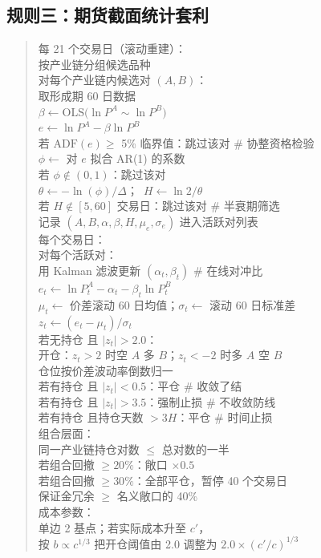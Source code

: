 \subsection{规则三：期货截面统计套利}

\begin{quote}\ttfamily\small
每 21 个交易日（滚动重建）：\\[2pt]
\quad 按产业链分组候选品种\\[2pt]
\quad 对每个产业链内候选对 $(A,B)$：\\
\qquad 取形成期 60 日数据\\
\qquad $\beta \gets \mathrm{OLS}\big(\ln P^A \sim \ln P^B\big)$\\
\qquad $e \gets \ln P^A-\beta\ln P^B$\\
\qquad 若 $\mathrm{ADF}(e)\ge$ 5\% 临界值：跳过该对 \hfill \# 协整资格检验\\
\qquad $\phi \gets$ 对 $e$ 拟合 AR(1) 的系数\\
\qquad 若 $\phi\notin(0,1)$：跳过该对\\
\qquad $\theta \gets -\ln(\phi)/\Delta$；\ $H \gets \ln 2/\theta$\\
\qquad 若 $H\notin[5,60]$ 交易日：跳过该对 \hfill \# 半衰期筛选\\
\qquad 记录 $(A,B,\alpha,\beta,H,\mu_e,\sigma_e)$ 进入活跃对列表\\[2pt]
每个交易日：\\[2pt]
\quad 对每个活跃对：\\
\qquad 用 Kalman 滤波更新 $(\alpha_t,\beta_t)$ \hfill \# 在线对冲比\\
\qquad $e_t \gets \ln P^A_t-\alpha_t-\beta_t\ln P^B_t$\\
\qquad $\mu_t \gets$ 价差滚动 60 日均值；$\sigma_t \gets$ 滚动 60 日标准差\\
\qquad $z_t \gets (e_t-\mu_t)/\sigma_t$\\[2pt]
\qquad 若无持仓 且 $|z_t|>2.0$：\\
\qquad\qquad 开仓：$z_t>2$ 时空 $A$ 多 $B$；$z_t<-2$ 时多 $A$ 空 $B$\\
\qquad\qquad 仓位按价差波动率倒数归一\\
\qquad 若有持仓 且 $|z_t|<0.5$：平仓 \hfill \# 收敛了结\\
\qquad 若有持仓 且 $|z_t|>3.5$：强制止损 \hfill \# 不收敛防线\\
\qquad 若有持仓 且持仓天数 $>3H$：平仓 \hfill \# 时间止损\\[2pt]
\quad 组合层面：\\
\qquad 同一产业链持仓对数 $\le$ 总对数的一半\\
\qquad 若组合回撤 $\ge20\%$：敞口 $\times0.5$\\
\qquad 若组合回撤 $\ge30\%$：全部平仓，暂停 40 个交易日\\
\qquad 保证金冗余 $\ge$ 名义敞口的 40\%\\[2pt]
\quad 成本参数：\\
\qquad 单边 2 基点；若实际成本升至 $c'$，\\
\qquad 按 $b\propto c^{1/3}$ 把开仓阈值由 2.0 调整为 $2.0\times(c'/c)^{1/3}$
\end{quote}

